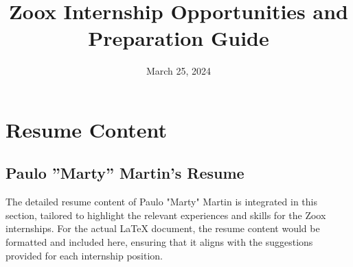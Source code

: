 \documentclass[11pt]{article}
\title{Zoox Internship Opportunities and Preparation Guide}
\author{}
\date{March 25, 2024}
\begin{document}
\maketitle
\newpage
\tableofcontents
\newpage




\newpage




\section*{Resume Content}
\subsection*{Paulo ”Marty” Martin's Resume}
The detailed resume content of Paulo "Marty" Martin is integrated in this section, tailored to highlight the relevant experiences and skills for the Zoox internships. For the actual LaTeX document, the resume content would be formatted and included here, ensuring that it aligns with the suggestions provided for each internship position.

\end{document}
